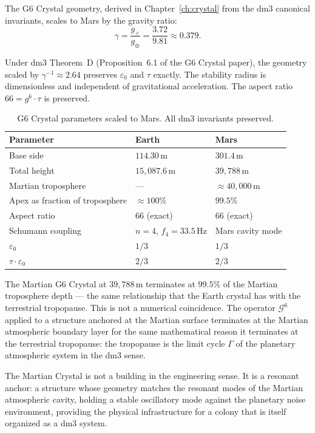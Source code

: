 The G6 Crystal geometry, derived in Chapter~\ref{ch:crystal}
from the dm3 canonical invariants, scales to Mars by the gravity ratio:
\[
\gamma = \frac{g_\Mars}{g_\oplus} = \frac{3.72}{9.81} \approx 0.379.
\]

Under dm3 Theorem~D (Proposition~6.1 of the G6 Crystal paper), the
geometry scaled by $\gamma^{-1} \approx 2.64$ preserves $\varepsilon_0$
and $\tau$ exactly. The stability radius is dimensionless and independent
of gravitational acceleration. The aspect ratio $66 = g^6 \cdot \tau$
is preserved.

\begin{table}[h]
\centering
\small
\begin{tabular}{lll}
\toprule
\textbf{Parameter} & \textbf{Earth} & \textbf{Mars} \\
\midrule
Base side & $114.30\,\mathrm{m}$ & $301.4\,\mathrm{m}$ \\
Total height & $15{,}087.6\,\mathrm{m}$ & $39{,}788\,\mathrm{m}$ \\
Martian troposphere & --- & $\approx 40{,}000\,\mathrm{m}$ \\
Apex as fraction of troposphere & $\approx 100\%$ & $99.5\%$ \\
Aspect ratio & $66$ (exact) & $66$ (exact) \\
Schumann coupling & $n=4$, $f_4 = 33.5\,\mathrm{Hz}$ &
  Mars cavity mode \\
$\varepsilon_0$ & $1/3$ & $1/3$ \\
$\tau \cdot \varepsilon_0$ & $2/3$ & $2/3$ \\
\bottomrule
\end{tabular}
\caption{G6 Crystal parameters scaled to Mars. All dm3 invariants preserved.}
\label{tab:mars-crystal}
\end{table}

The Martian G6 Crystal at $39{,}788\,\mathrm{m}$ terminates at
$99.5\%$ of the Martian troposphere depth --- the same relationship
that the Earth crystal has with the terrestrial tropopause. This is
not a numerical coincidence. The operator $\mathcal{G}^6$ applied to a
structure anchored at the Martian surface terminates at the Martian
atmospheric boundary layer for the same mathematical reason it
terminates at the terrestrial tropopause: the tropopause is the limit
cycle $\Gamma$ of the planetary atmospheric system in the dm3 sense.

The Martian Crystal is not a building in the engineering sense.
It is a resonant anchor: a structure whose geometry matches the
resonant modes of the Martian atmospheric cavity, holding a stable
oscillatory mode against the planetary noise environment, providing
the physical infrastructure for a colony that is itself organized
as a dm3 system.


